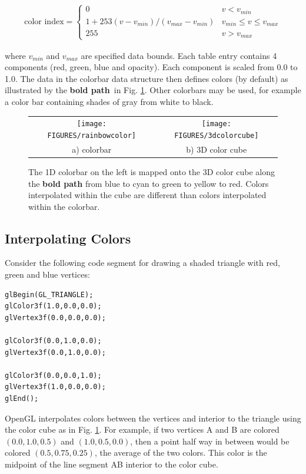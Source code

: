 \documentclass[11pt,twoside]{book}
\begin{document}
\begin{eqnarray}
\mbox{color index}=\left\{
\begin{array}{ll}
  0 & v < v_{min}\\
  1+253(v-v_{min})/(v_{max}-v_{min}) & v_{min}\le v \le v_{max} \\
  255 & v > v_{max}
\end{array}
\right.
\end{eqnarray}

\noindent where $v_{min}$ and $v_{max}$ are specified data bounds.
Each table entry contains 4 components (red, green, blue and
opacity).  Each component is scaled from 0.0 to 1.0.  The data in
the colorbar data structure then defines colors (by default) as
illustrated by the {\bf bold path}\ in Fig. \ref{colorbarinfo}.
Other colorbars may be used, for example a color bar containing
shades of gray from white to black.


\begin{figure}[\figoptions]
\begin{center}
\begin{tabular}{cc}
\texttt{[image: FIGURES/rainbowcolor]}&\texttt{[image: FIGURES/3dcolorcube]}\\
a) colorbar&b) 3D color cube\\
\end{tabular}
\end{center}
\caption[1D colorbar and 3D color cube]{The 1D colorbar on the
left is mapped onto the 3D color cube along the {\bf bold path}
from blue to cyan to green to yellow to red.  Colors interpolated
within the cube are different than colors interpolated within the
colorbar.}
\label{colorbarinfo}%
\end{figure}

\subsection{Interpolating Colors}

Consider the following code segment for drawing a shaded triangle
with red, green and blue vertices:
\begin{lstlisting}
glBegin(GL_TRIANGLE);
glColor3f(1.0,0.0,0.0);
glVertex3f(0.0,0.0,0.0);

glColor3f(0.0,1.0,0.0);
glVertex3f(0.0,1.0,0.0);

glColor3f(0.0,0.0,1.0);
glVertex3f(1.0,0.0,0.0);
glEnd();
\end{lstlisting}

OpenGL interpolates colors between the vertices and interior to
the triangle using the color cube as in Fig. \ref{colorbarinfo}.
For example, if two vertices A and B are colored $(0.0,1.0,0.5)$
and $(1.0,0.5,0.0)$, then a point half way in between would be
colored $(0.5,0.75,0.25)$, the average of the two colors.  This
color is the midpoint of the line segment AB interior to the color
cube.
\end{document}
